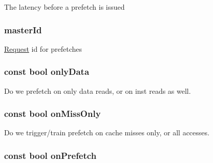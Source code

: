 \label{classBasePrefetcher_a46b9d67ee437c6ecdbedca8ec8d2ed40}
The latency before a prefetch is issued \hypertarget{classBasePrefetcher_a96ec6a422ac492d05f8b3edc5b58532b}{
\subsubsection[{masterId}]{ {\bf masterId}}}
\label{classBasePrefetcher_a96ec6a422ac492d05f8b3edc5b58532b}
\hyperlink{classRequest}{Request} id for prefetches \hypertarget{classBasePrefetcher_a8762c4c2c983c8eadd6c7bccfe973f5f}{
\subsubsection[{onlyData}]{\setlength{\rightskip}{0pt plus 5cm}const bool {\bf onlyData}}}
\label{classBasePrefetcher_a8762c4c2c983c8eadd6c7bccfe973f5f}
Do we prefetch on only data reads, or on inst reads as well. \hypertarget{classBasePrefetcher_ade1681d5d6ad302db05a204fd920a110}{
\subsubsection[{onMissOnly}]{\setlength{\rightskip}{0pt plus 5cm}const bool {\bf onMissOnly}}}
\label{classBasePrefetcher_ade1681d5d6ad302db05a204fd920a110}
Do we trigger/train prefetch on cache misses only, or all accesses. \hypertarget{classBasePrefetcher_a632f5ff02feaeadf06e58c82f3fb43c3}{
\subsubsection[{onPrefetch}]{\setlength{\rightskip}{0pt plus 5cm}const bool {\bf onPrefetch}}}
